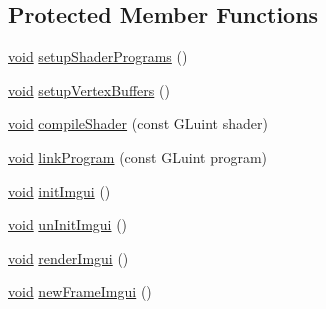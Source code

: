 \subsection*{Protected Member Functions}
\begin{DoxyCompactItemize}
\item 
\mbox{\hyperlink{_thread_8h_af1e856da2e658414cb2456cb6f7ebc66}{void}} \mbox{\hyperlink{classnjli_1_1_world_debug_drawer_a909649fb3b8e4eab5b8b76370b0e66d0}{setup\+Shader\+Programs}} ()
\item 
\mbox{\hyperlink{_thread_8h_af1e856da2e658414cb2456cb6f7ebc66}{void}} \mbox{\hyperlink{classnjli_1_1_world_debug_drawer_ad67f8074167c127eb49596c6d2d813a4}{setup\+Vertex\+Buffers}} ()
\item 
\mbox{\hyperlink{_thread_8h_af1e856da2e658414cb2456cb6f7ebc66}{void}} \mbox{\hyperlink{classnjli_1_1_world_debug_drawer_a48de01f1761e56a8511925468f6a802a}{compile\+Shader}} (const G\+Luint shader)
\item 
\mbox{\hyperlink{_thread_8h_af1e856da2e658414cb2456cb6f7ebc66}{void}} \mbox{\hyperlink{classnjli_1_1_world_debug_drawer_a9f85884fc0612b81a189fa42b28c6707}{link\+Program}} (const G\+Luint program)
\item 
\mbox{\hyperlink{_thread_8h_af1e856da2e658414cb2456cb6f7ebc66}{void}} \mbox{\hyperlink{classnjli_1_1_world_debug_drawer_aed4000f5c9f1a4b5be0fdd6b48e9d68e}{init\+Imgui}} ()
\item 
\mbox{\hyperlink{_thread_8h_af1e856da2e658414cb2456cb6f7ebc66}{void}} \mbox{\hyperlink{classnjli_1_1_world_debug_drawer_a0c68d5133dbbebd5e9f7cf46d8e9e12f}{un\+Init\+Imgui}} ()
\item 
\mbox{\hyperlink{_thread_8h_af1e856da2e658414cb2456cb6f7ebc66}{void}} \mbox{\hyperlink{classnjli_1_1_world_debug_drawer_a303d644236ffcfe2216a0ce445b0e74c}{render\+Imgui}} ()
\item 
\mbox{\hyperlink{_thread_8h_af1e856da2e658414cb2456cb6f7ebc66}{void}} \mbox{\hyperlink{classnjli_1_1_world_debug_drawer_afa1b4bf7b377c085e4ed2a5b41b13adb}{new\+Frame\+Imgui}} ()
\end{DoxyCompactItemize}
